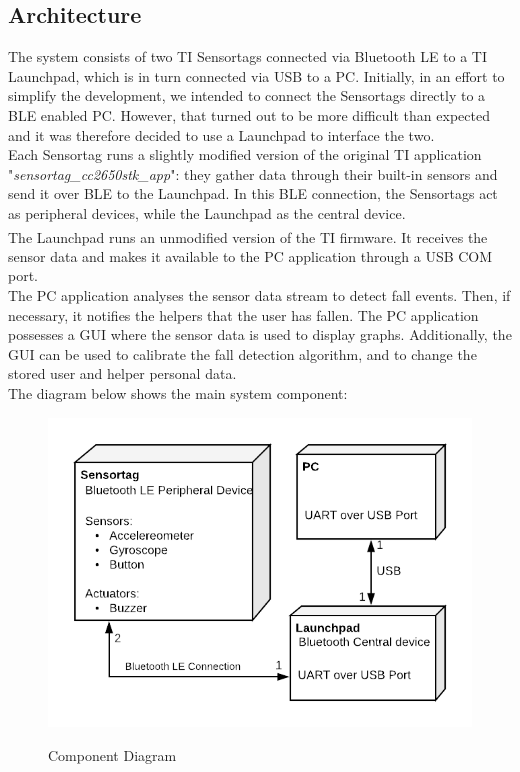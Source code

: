 \documentclass[hidelinks,conference,12pt]{IEEETran}
\begin{document}
\subsection{Architecture}
The system consists of two TI Sensortags connected via Bluetooth LE to a TI Launchpad, which is in turn connected via USB to a PC. Initially, in an effort to simplify the development, we intended to connect the Sensortags directly to a BLE enabled PC. However, that turned out to be more difficult than expected and it was therefore decided to use a Launchpad to interface the two.\\
Each Sensortag runs a slightly modified version of the original TI application "\textit{sensortag\_cc2650stk\_app}": they gather data through their built-in sensors and send it over BLE to the Launchpad. In this BLE connection, the Sensortags act as peripheral devices, while the Launchpad as the central device.\\
The Launchpad runs an unmodified version of the TI firmware\textsuperscript{\cite{hosttest}}. It receives the sensor data and makes it available to the PC application through a USB COM port.\\
The PC application analyses the sensor data stream to detect fall events. Then, if necessary, it notifies the helpers that the user has fallen. The PC application possesses a GUI where the sensor data is used to display graphs. Additionally, the GUI can be used to calibrate the fall detection algorithm, and to change the stored user and helper personal data.\\
The diagram below shows the main system component:
\FloatBarrier
\begin{figure}[!h]
	\centering
	\caption{Component Diagram}
	\includegraphics[scale=0.4]{images/Comp_Diag2.png}
	\label{img:compdiag}
\end{figure}
\FloatBarrier
\end{document}
